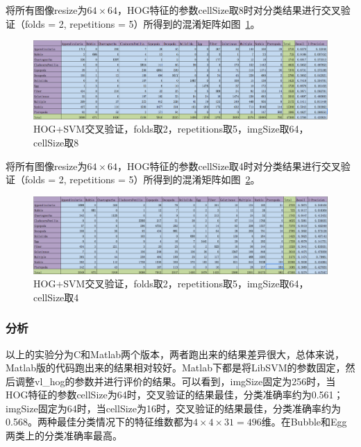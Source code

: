 \documentclass[12pt]{article}
\begin{document}
\begin{enumerate}
将所有图像resize为$64 \times 64$，HOG特征的参数cellSize取8时对分类结果进行交叉验证（folds = 2, repetitions = 5）所得到的混淆矩阵如图~\ref{fig: HOG-SVM-2-folds-5-repetitions-8-64}。
\begin{figure}[!ht]
\centering
\includegraphics[width=1.0\linewidth]{HOG-SVM-2-folds-5-repetitions-8-64}
\caption{HOG+SVM交叉验证，folds取2，repetitions取5，imgSize取64，cellSize取8}
\label{fig: HOG-SVM-2-folds-5-repetitions-8-64}
\end{figure}

将所有图像resize为$64 \times 64$，HOG特征的参数cellSize取4时对分类结果进行交叉验证（folds = 2, repetitions = 5）所得到的混淆矩阵如图~\ref{fig: HOG-SVM-2-folds-5-repetitions-4-64}。
\begin{figure}[!ht]
\centering
\includegraphics[width=1.0\linewidth]{HOG-SVM-2-folds-5-repetitions-4-64}
\caption{HOG+SVM交叉验证，folds取2，repetitions取5，imgSize取64，cellSize取4}
\label{fig: HOG-SVM-2-folds-5-repetitions-4-64}
\end{figure}

\end{enumerate}

\subsubsection{分析}

以上的实验分为C和Matlab两个版本，两者跑出来的结果差异很大，总体来说，Matlab版的代码跑出来的结果相对较好。Matlab下都是将LibSVM的参数固定，然后调整vl\_hog的参数并进行评价的结果。可以看到，imgSize固定为256时，当HOG特征的参数cellSize为64时，交叉验证的结果最佳，分类准确率约为0.561；imgSize固定为64时，当cellSize为16时，交叉验证的结果最佳，分类准确率约为0.568。两种最佳分类情况下的特征维数都为$4\times 4\times 31=496$维。在Bubble和Egg两类上的分类准确率最高。
\end{document}
